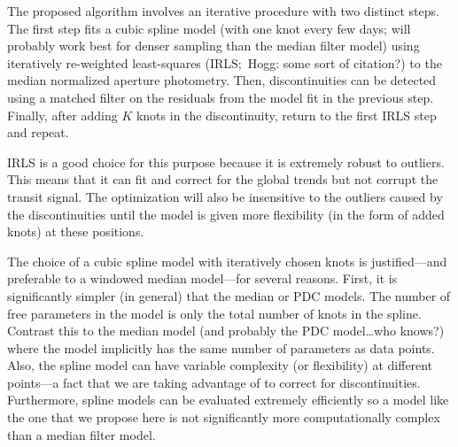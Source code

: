 \documentclass[letterpaper,12pt,preprint]{hack_aastex}
\begin{document}
The proposed algorithm involves an iterative procedure with two distinct
steps.
The first step fits a cubic spline model (with one knot every few days; will
probably work best for denser sampling than the median filter model) using
iteratively re-weighted least-squares (IRLS;\ Hogg: some sort of citation?) to
the median normalized aperture photometry.
Then, discontinuities can be detected using a matched filter on the residuals
from the model fit in the previous step.
Finally, after adding $K$ knots in the discontinuity, return to the first IRLS
step and repeat.

IRLS is a good choice for this purpose because it is extremely robust to
outliers.
This means that it can fit and correct for the global trends but not corrupt
the transit signal.
The optimization will also be insensitive to the outliers caused by the
discontinuities until the model is given more flexibility (in the form of
added knots) at these positions.

The choice of a cubic spline model with iteratively chosen knots is
justified---and preferable to a windowed median model---for several reasons.
First, it is significantly simpler (in general) that the median or PDC models.
The number of free parameters in the model is only the total number of knots
in the spline.
Contrast this to the median model (and probably the PDC model\ldots who
knows?) where the model implicitly has the same number of parameters as
data points.
Also, the spline model can have variable complexity (or flexibility) at
different points---a fact that we are taking advantage of to correct for
discontinuities.
Furthermore, spline models can be evaluated extremely efficiently so a model
like the one that we propose here is not significantly more computationally
complex than a median filter model.
\end{document}
